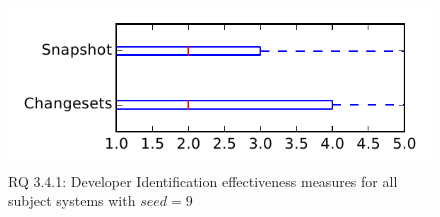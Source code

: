 
\begin{figure}
\centering
\includegraphics[height=0.4\textheight]{figures/dit_seed/rq1_tiny_9}
\caption{RQ 3.4.1: Developer Identification effectiveness measures for all subject systems with $seed=9$}
\label{fig:dit_seed:rq1:tiny}
\end{figure}
